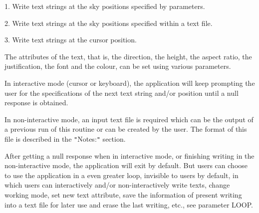 \begin{small}
{{         1. Write text strings at the sky positions specified by
         parameters.

         2. Write text strings at the sky positions specified within
         a text file.

         3. Write text strings at the cursor position.

      The attributes of the text, that is, the direction, the height,
      the aspect ratio, the justification, the font and the colour, can
      be set using various parameters.

      In interactive mode (cursor or keyboard), the application will
      keep prompting the user for the specifications of the next text
      string and/or position until a null response is obtained.

      In non-interactive mode, an input text file is required which can
      be the output of a previous run of this routine or can be created
      by the user. The format of this file is described in the {\tt "}Notes:{\tt "}
      section.

      After getting a null response when in interactive mode, or
      finishing writing in the non-interactive mode, the application
      will exit by default. But users can choose to use the application
      in a even greater loop, invisible to users by default, in which
      users can interactively and/or non-interactively write texts,
      change working mode, set new text attribute, save the information
      of present writing into a text file for later use and erase the
      last writing, etc., see parameter LOOP.
   }
   }
\end{small}
